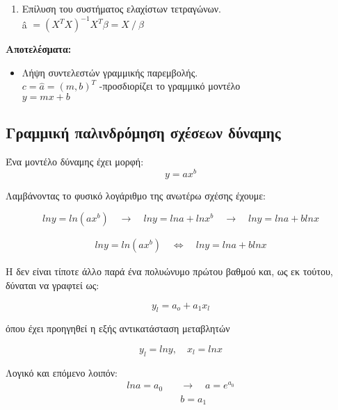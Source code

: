 \begin{refsection}
\begin{tcolorbox}[breakable, fonttitle=\bfseries, title=Αλγόριθμος 1: Γραμμική μοντελοποίηση]
\begin{enumerate}
\begin{algorithm}[H]

\end{algorithm}\DecMargin{3em}

\item Επίλυση του συστήματος ελαχίστων τετραγώνων.\\
\^{a} $= ( X^T X )^{-1} X^T \beta = Χ \: / \: \beta$ 
 
\end{enumerate}
 
\large \textbf{Αποτελέσματα:}
\begin{itemize}
\item Λήψη συντελεστών γραμμικής παρεμβολής.\\ $ c = \hat{a} = (m, b)^T $ \hfill -προσδιορίζει το γραμμικό μοντέλο\\ \phantom{a} \hfill $y = mx + b$
\end{itemize}

\end{tcolorbox}

\subsection*{Γραμμική παλινδρόμηση σχέσεων δύναμης}

\noindent Ένα μοντέλο δύναμης έχει μορφή:
\begin{equation*}
y = ax^b
\end{equation*}

\noindent Λαμβάνοντας το φυσικό λογάριθμο της ανωτέρω σχέσης έχουμε:

$$lny = ln \left(ax^b\right) \quad \longrightarrow \quad lny = lna + lnx^b \quad \longrightarrow \quad lny = lna + blnx$$

\begin{align}\label{eq:tran}
\boxed{
lny = ln \left(ax^b\right) \quad \Longleftrightarrow \quad lny = lna + blnx
}
\end{align}

\noindent Η  δεν είναι τίποτε άλλο παρά ένα πολυώνυμο πρώτου βαθμού και, ως εκ τούτου, δύναται να γραφτεί ως:

 $$y_l = a_o + a_1 x_l$$	

\noindent όπου έχει προηγηθεί η εξής αντικατάσταση μεταβλητών

$$y_l = lny, \quad x_l = lnx$$

\noindent Λογικό και επόμενο λοιπόν:
\begin{align}
lna = a_0 \quad &\longrightarrow \quad \boxed{a = e^{a_{0}}}\\
&\boxed{b = a_1}
\end{align}


\end{refsection}
